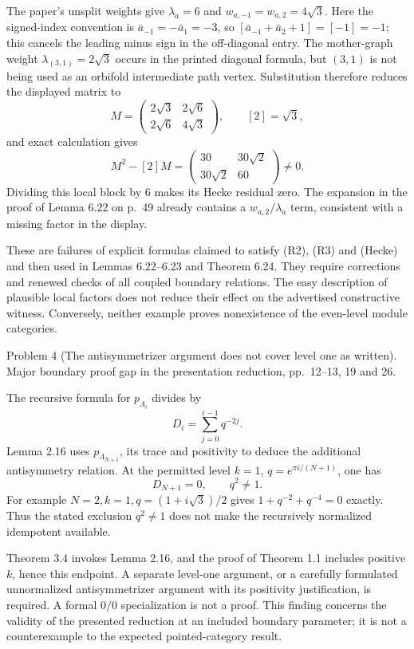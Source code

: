 \documentclass[10pt]{article}
\begin{document}
The paper’s unsplit weights give \(\lambda_a=6\) and \(w_{a,-1}=w_{a,2}=4\sqrt3\). Here the signed-index convention is \(\bar a_{-1}=-\bar a_1=-3\), so \([\bar a_{-1}+\bar a_2+1]=[-1]=-1\); this cancels the leading minus sign in the off-diagonal entry. The mother-graph weight \(\lambda_{(3,1)}=2\sqrt3\) occurs in the printed diagonal formula, but \((3,1)\) is not being used as an orbifold intermediate path vertex. Substitution therefore reduces the displayed matrix to \[M=\begin{pmatrix}2\sqrt3&2\sqrt6\\2\sqrt6&4\sqrt3\end{pmatrix},
 \qquad [2]=\sqrt3,\] and exact calculation gives \[M^2-[2]M
 =\begin{pmatrix}30&30\sqrt2\\30\sqrt2&60\end{pmatrix}\ne0.\] Dividing this local block by \(6\) makes its Hecke residual zero. The expansion in the proof of Lemma 6.22 on p. 49 already contains a \(w_{a,2}/\lambda_a\) term, consistent with a missing factor in the display.\par
These are failures of explicit formulas claimed to satisfy (R2), (R3) and (Hecke) and then used in Lemmas 6.22–6.23 and Theorem 6.24. They require corrections and renewed checks of all coupled boundary relations. The easy description of plausible local factors does not reduce their effect on the advertised constructive witness. Conversely, neither example proves nonexistence of the even-level module categories.\par
Problem 4 (The antisymmetrizer argument does not cover level one as written).  Major boundary proof gap in the presentation reduction, pp. 12–13, 19 and 26.\par
The recursive formula for \(p_{\Lambda_i}\) divides by \[D_i=\sum_{j=0}^{i-1}q^{-2j}.\] Lemma 2.16 uses \(p_{\Lambda_{N+1}}\), its trace and positivity to deduce the additional antisymmetry relation. At the permitted level \(k=1\), \(q=e^{\pi i/(N+1)}\), one has \[D_{N+1}=0,\qquad q^2\ne1.\] For example \(N=2,k=1,q=(1+i\sqrt3)/2\) gives \(1+q^{-2}+q^{-4}=0\) exactly. Thus the stated exclusion \(q^2\ne1\) does not make the recursively normalized idempotent available.\par
Theorem 3.4 invokes Lemma 2.16, and the proof of Theorem 1.1 includes positive \(k\), hence this endpoint. A separate level-one argument, or a carefully formulated unnormalized antisymmetrizer argument with its positivity justification, is required. A formal \(0/0\) specialization is not a proof. This finding concerns the validity of the presented reduction at an included boundary parameter; it is not a counterexample to the expected pointed-category result.\par
\end{document}
